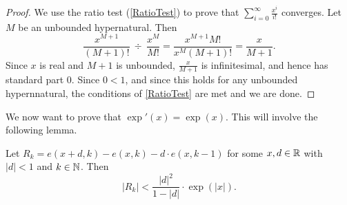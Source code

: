 \begin{proof}
    We use the ratio test (\autoref{RatioTest}) to prove that $\sum_{i=0}^\infty \frac{x^i}{i!}$ converges. Let $M$ be an unbounded hypernatural. Then 
    \[
        \frac{x^{M+1}}{(M+1)!} \  \div \  \frac{x^M}{M!} = \frac{x^{M+1}M!}{x^M (M+1)!} 
        = \frac{x}{M+1}.
    \]
    Since $x$ is real and $M+1$ is unbounded, $\frac{x}{M+1}$ is infinitesimal, and hence has standard part $0$. Since $0 < 1$, and since this holds for any unbounded hypernnatural, the conditions of \autoref{RatioTest} are met and we are done.
\end{proof}

We now want to prove that $\exp'(x) = \exp(x)$. This will involve the following lemma.

\begin{lemma}\label{expRemainderLemma}
    Let $R_k = e(x+d, k) - e(x, k) - d \cdot e(x, k-1)$ for some $x, d \in \mathbb{R}$ with $|d| < 1$ and $k \in \mathbb{N}$. Then
    \[ |R_k| < \frac{|d|^2}{1-|d|} \cdot \exp(|x|). \]
\end{lemma}

